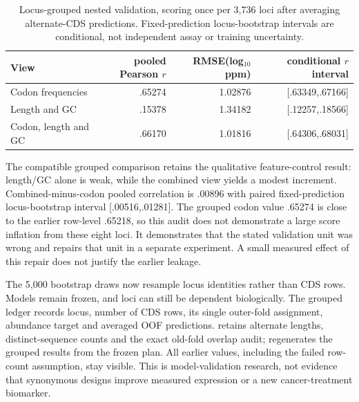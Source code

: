 \begin{table}[ht]\centering\small
\caption{Locus-grouped nested validation, scoring once per 3,736 loci after averaging alternate-CDS predictions. Fixed-prediction locus-bootstrap intervals are conditional, not independent assay or training uncertainty.}
\begin{tabular}{lrrr}\hline
View & pooled Pearson $r$ & RMSE(log$_{10}$ ppm) & conditional $r$ interval\\\hline
Codon frequencies & .65274 & 1.02876 & [.63349,.67166]\\
Length and GC & .15378 & 1.34182 & [.12257,.18566]\\
Codon, length and GC & .66170 & 1.01816 & [.64306,.68031]\\\hline
\end{tabular}\end{table}

The compatible grouped comparison retains the qualitative feature-control result: length/GC alone is weak, while the combined view yields a modest increment. Combined-minus-codon pooled correlation is .00896 with paired fixed-prediction locus-bootstrap interval [.00516,.01281]. The grouped codon value .65274 is close to the earlier row-level .65218, so this audit does not demonstrate a large score inflation from these eight loci. It demonstrates that the stated validation unit was wrong and repairs that unit in a separate experiment. A small measured effect of this repair does not justify the earlier leakage.

The 5,000 bootstrap draws now resample locus identities rather than CDS rows. Models remain frozen, and loci can still be dependent biologically. The grouped ledger records locus, number of CDS rows, its single outer-fold assignment, abundance target and averaged OOF predictions.  retains alternate lengths, distinct-sequence counts and the exact old-fold overlap audit;  regenerates the grouped results from the frozen plan. All earlier values, including the failed row-count assumption, stay visible. This is model-validation research, not evidence that synonymous designs improve measured expression or a new cancer-treatment biomarker.

